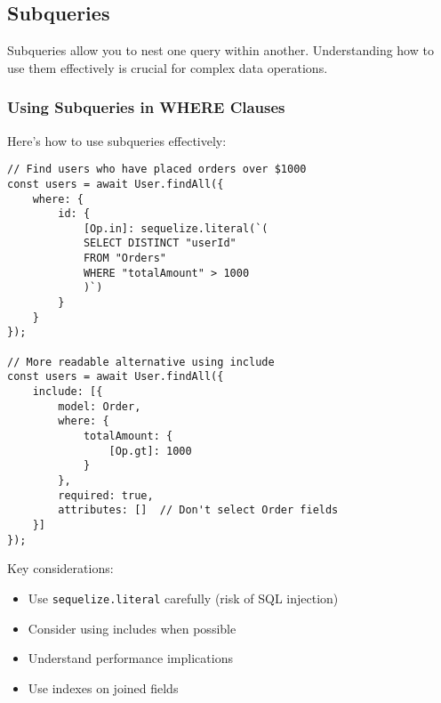 \documentclass[12pt,a4paper]{book}
\begin{document}
	\subsection{Subqueries}
	Subqueries allow you to nest one query within another. Understanding how to use them effectively is crucial for complex data operations.
	
	\subsubsection{Using Subqueries in WHERE Clauses}
	\begin{tcolorbox}[title=Subquery Examples]
		Here's how to use subqueries effectively:
		
		\begin{verbatim}
// Find users who have placed orders over $1000
const users = await User.findAll({
	where: {
		id: {
			[Op.in]: sequelize.literal(`(
			SELECT DISTINCT "userId"
			FROM "Orders"
			WHERE "totalAmount" > 1000
			)`)
		}
	}
});

// More readable alternative using include
const users = await User.findAll({
	include: [{
		model: Order,
		where: {
			totalAmount: {
				[Op.gt]: 1000
			}
		},
		required: true,
		attributes: []  // Don't select Order fields
	}]
});
		\end{verbatim}
		
		Key considerations:
		\begin{itemize}
			\item Use \texttt{sequelize.literal} carefully (risk of SQL injection)
			\item Consider using includes when possible
			\item Understand performance implications
			\item Use indexes on joined fields
		\end{itemize}
	\end{tcolorbox}
	
\end{document}
